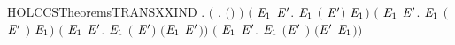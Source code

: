 \begin{SaveVerbatim}{HOLCCSTheoremsTRANSXXIND}
\HOLTokenTurnstile{} \HOLSymConst{\HOLTokenForall{}}.
       \ensuremath{(}\HOLSymConst{\HOLTokenForall{}} .  \ensuremath{(}\HOLSymConst{\ensuremath{\ldotp}}\ensuremath{)}  \ensuremath{)} \HOLSymConst{\HOLTokenConj{}}
       \ensuremath{(}\HOLSymConst{\HOLTokenForall{}}  \ensuremath{\HOLBoundVar{E}\sb{\mathrm{1}}} \ensuremath{\HOLBoundVar{E}\sp{\prime}}.    \ensuremath{\HOLBoundVar{E}\sb{\mathrm{1}}} \HOLSymConst{\HOLTokenImp{}}  \ensuremath{(} \HOLSymConst{\ensuremath{+}} \ensuremath{\HOLBoundVar{E}\sp{\prime}}\ensuremath{)}  \ensuremath{\HOLBoundVar{E}\sb{\mathrm{1}}}\ensuremath{)} \HOLSymConst{\HOLTokenConj{}}
       \ensuremath{(}\HOLSymConst{\HOLTokenForall{}}  \ensuremath{\HOLBoundVar{E}\sb{\mathrm{1}}} \ensuremath{\HOLBoundVar{E}\sp{\prime}}.    \ensuremath{\HOLBoundVar{E}\sb{\mathrm{1}}} \HOLSymConst{\HOLTokenImp{}}  \ensuremath{(}\ensuremath{\HOLBoundVar{E}\sp{\prime}} \HOLSymConst{\ensuremath{+}} \ensuremath{)}  \ensuremath{\HOLBoundVar{E}\sb{\mathrm{1}}}\ensuremath{)} \HOLSymConst{\HOLTokenConj{}}
       \ensuremath{(}\HOLSymConst{\HOLTokenForall{}}  \ensuremath{\HOLBoundVar{E}\sb{\mathrm{1}}} \ensuremath{\HOLBoundVar{E}\sp{\prime}}.    \ensuremath{\HOLBoundVar{E}\sb{\mathrm{1}}} \HOLSymConst{\HOLTokenImp{}}  \ensuremath{(} \HOLSymConst{\ensuremath{\mid}} \ensuremath{\HOLBoundVar{E}\sp{\prime}}\ensuremath{)}  \ensuremath{(}\ensuremath{\HOLBoundVar{E}\sb{\mathrm{1}}} \HOLSymConst{\ensuremath{\mid}} \ensuremath{\HOLBoundVar{E}\sp{\prime}}\ensuremath{)}\ensuremath{)} \HOLSymConst{\HOLTokenConj{}}
       \ensuremath{(}\HOLSymConst{\HOLTokenForall{}}  \ensuremath{\HOLBoundVar{E}\sb{\mathrm{1}}} \ensuremath{\HOLBoundVar{E}\sp{\prime}}.    \ensuremath{\HOLBoundVar{E}\sb{\mathrm{1}}} \HOLSymConst{\HOLTokenImp{}}  \ensuremath{(}\ensuremath{\HOLBoundVar{E}\sp{\prime}} \HOLSymConst{\ensuremath{\mid}} \ensuremath{)}  \ensuremath{(}\ensuremath{\HOLBoundVar{E}\sp{\prime}} \HOLSymConst{\ensuremath{\mid}} \ensuremath{\HOLBoundVar{E}\sb{\mathrm{1}}}\ensuremath{)}\ensuremath{)} \HOLSymConst{\HOLTokenConj{}}

\end{SaveVerbatim}
